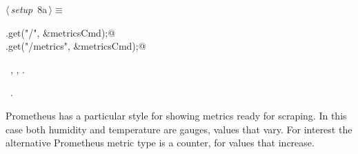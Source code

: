 \documentclass[a4paper, 11pt]{article}
\begin{document}
\begin{flushleft} \small
\begin{minipage}{\linewidth}\label{scrap10}\raggedright\small
{}$\langle\,${\itshape setup}\nobreak\ {\footnotesize{8a}}$\,\rangle\equiv$
\vspace{-1ex}
\begin{list}{}{\setlength{\leftmargin}{1em}} \item
\mbox{}\lstinline@app.get("/", &metricsCmd);@\\
\mbox{}\lstinline@app.get("/metrics", &metricsCmd);@\\
\mbox{}{\NWsep}
\end{list}
\vspace{-1ex}
\vspace{-1ex}
\footnotesize
\begin{list}{}{\setlength{\itemsep}{-\parsep}\setlength{\itemindent}{-\leftmargin}}
\item \NWtxtMacroDefBy\ , , .
\item \NWtxtMacroRefIn\ .
\end{list}
\end{minipage}
\end{flushleft}

Prometheus has a particular style for showing metrics ready for scraping.
In this case both humidity and temperature are gauges,
values that vary.
For interest the alternative Prometheus metric type is a counter,
for values that increase.
\end{document}
